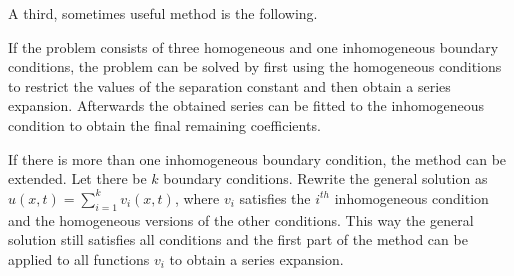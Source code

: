     A third, sometimes useful method is the following.
    \begin{method}
        If the problem consists of three homogeneous and one inhomogeneous boundary conditions, the problem can be solved by first using the homogeneous conditions to restrict the values of the separation constant and then obtain a series expansion. Afterwards the obtained series can be fitted to the inhomogeneous condition to obtain the final remaining coefficients.

        If there is more than one inhomogeneous boundary condition, the method can be extended. Let there be $k$ boundary conditions. Rewrite the general solution as $u(x,t) = \sum_{i=1}^kv_i(x,t)$, where $v_i$ satisfies the $i^{th}$ inhomogeneous condition and the homogeneous versions of the other conditions. This way the general solution still satisfies all conditions and the first part of the method can be applied to all functions $v_i$ to obtain a series expansion.
    \end{method}

